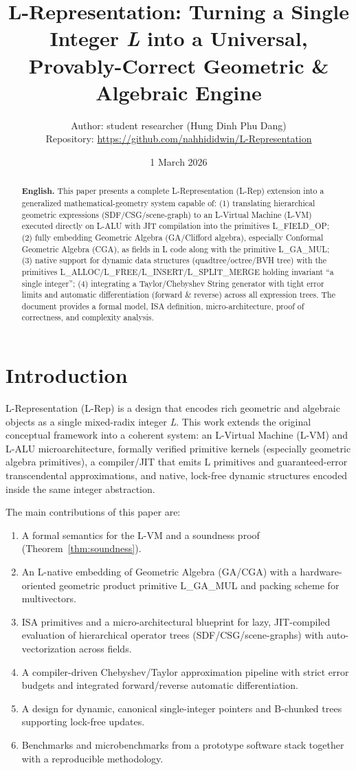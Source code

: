 \documentclass[11pt]{article}
\title{L-Representation: Turning a Single Integer \textit{L} into a Universal, Provably-Correct Geometric \& Algebraic Engine}
\author{Author: student researcher (Hung Dinh Phu Dang) \\
\small Repository: \url{https://github.com/nahhididwin/L-Representation}}
\date{1 March 2026}
\theoremstyle{definition}
\theoremstyle{plain}
\begin{document}
\maketitle

\begin{abstract}

\textbf{English.} This paper presents a complete L-Representation (L-Rep) extension into a generalized mathematical-geometry system capable of: (1) translating hierarchical geometric expressions (SDF/CSG/scene-graph) to an L-Virtual Machine (L-VM) executed directly on L-ALU with JIT compilation into the primitives L\_FIELD\_OP; (2) fully embedding Geometric Algebra (GA/Clifford algebra), especially Conformal Geometric Algebra (CGA), as fields in L code along with the primitive L\_GA\_MUL; (3) native support for dynamic data structures (quadtree/octree/BVH tree) with the primitives L\_ALLOC/L\_FREE/L\_INSERT/L\_SPLIT\_MERGE holding invariant “a single integer”; (4) integrating a Taylor/Chebyshev String generator with tight error limits and automatic differentiation (forward \& reverse) across all expression trees. The document provides a formal model, ISA definition, micro-architecture, proof of correctness, and complexity analysis.
\end{abstract}

\section{Introduction}
L-Representation (L-Rep) is a design that encodes rich geometric and algebraic objects as a single mixed-radix integer \textit{L}. This work extends the original conceptual framework into a coherent system: an L-Virtual Machine (L-VM) and L-ALU microarchitecture, formally verified primitive kernels (especially geometric algebra primitives), a compiler/JIT that emits L primitives and guaranteed-error transcendental approximations, and native, lock-free dynamic structures encoded inside the same integer abstraction.

The main contributions of this paper are:
\begin{enumerate}
  \item A formal semantics for the L-VM and a soundness proof (Theorem~\ref{thm:soundness}).
  \item An L-native embedding of Geometric Algebra (GA/CGA) with a hardware-oriented geometric product primitive L\_GA\_MUL and packing scheme for multivectors.
  \item ISA primitives and a micro-architectural blueprint for lazy, JIT-compiled evaluation of hierarchical operator trees (SDF/CSG/scene-graphs) with auto-vectorization across fields.
  \item A compiler-driven Chebyshev/Taylor approximation pipeline with strict error budgets and integrated forward/reverse automatic differentiation.
  \item A design for dynamic, canonical single-integer pointers and B-chunked trees supporting lock-free updates.
  \item Benchmarks and microbenchmarks from a prototype software stack together with a reproducible methodology.
\end{enumerate}
\end{document}
